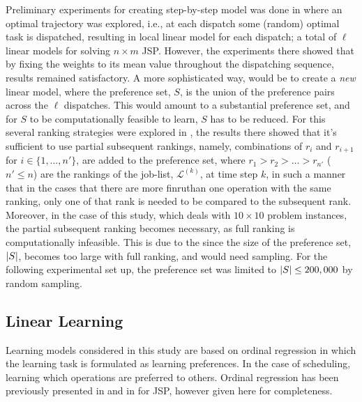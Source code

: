 \documentclass[smallextended]{svjour3}
\begin{document}
Preliminary experiments for creating step-by-step model was done in 
\cite{InRu11a} where an optimal trajectory was explored, i.e., at each dispatch 
some (random) optimal task is dispatched, resulting in local linear model for 
each dispatch; a total of $\ell$ linear models for solving $n\times m$ JSP. 
However, the experiments there showed that by fixing the weights to its mean 
value throughout the dispatching sequence, results remained satisfactory.
A more sophisticated way, would be to create a \emph{new} linear model, where 
the preference set, $S$, is the union of the preference pairs across the $\ell$ 
dispatches. This would amount to a substantial preference set, and for $S$ to 
be 
computationally feasible to learn, $S$ has to be reduced. For this several 
ranking strategies were explored in \cite{InRu15a}, the results there showed 
that it's sufficient to use partial subsequent rankings, namely, combinations 
of $r_i$ and $r_{i+1}$ for $i\in\{1,\ldots,n'\}$, are added to the preference 
set, where $r_1>r_2>\ldots>r_{n'}$ ($n'\leq n$) are the rankings of the 
job-list, $\mathcal{L}^{(k)}$, at time step $k$, in such a manner that in the 
cases that there are more finruthan one operation with the same ranking, only 
one of 
that rank is needed to be compared to the subsequent rank. Moreover, in the 
case of this study, which deals with $10\times 10$ problem instances, the 
partial subsequent ranking becomes necessary, as full ranking is 
computationally infeasible. This is due to the since the size of the preference 
set, $\lvert S\rvert$, becomes too large with full ranking, and would need sampling.
For the following experimental set up, the preference set was limited to 
$\lvert S\rvert\leq200,000$ by random sampling.

\subsection{Linear Learning}

Learning models considered in this study are based on ordinal regression in 
which the learning task is formulated as learning preferences. In the case of 
scheduling, learning which operations are preferred to others. Ordinal 
regression has been previously presented in \cite{Ru06:PPSN} and in 
\cite{InRu11a} for JSP, however given here for completeness. 
\end{document}
